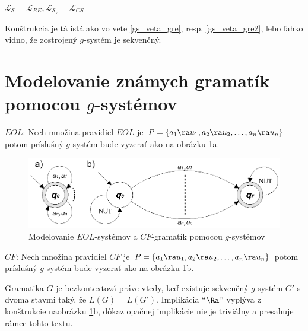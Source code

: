 \pagebreak

\begin{veta}\label{gs_veta_gsek}
$\mathcal{L}_{\mathcal{S}}=\mathcal{L}_{RE},
\mathcal{L}_{\mathcal{S}_\varepsilon}=\mathcal{L}_{CS}$
\end{veta}

\begin{dokaz}
Konštrukcia je tá istá ako vo vete \ref{gs_veta_gre}, resp.
\ref{gs_veta_gre2}, lebo ľahko vidno, že zostrojený $g$-systém je
sekvenčný.
\end{dokaz}

\section{Modelovanie známych gramatík pomocou $g$-systémov}

\begin{priklad}
\begin{description}
\item{$EOL$:} Nech množina pravidiel $EOL$ je $P=\{ a_1\ra u_1,a_2\ra u_2,\dots,a_n\ra u_n\}$
potom príslušný $g$-systém bude vyzerať ako na obrázku
\ref{gs_obr_EOL_g}a.

\begin{figure}[!ht]
\centering
\includegraphics{./OBRAZKY/GSYSTEMS/EOL_G}
\caption{Modelovanie $EOL$-systémov a $CF$-gramatík pomocou $g$-systémov}
\label{gs_obr_EOL_g}
\end{figure}

\item{$CF$:} Nech množina pravidiel $CF$ je $P=\{a_1\ra u_1, a_2\ra u_2,\dots,a_n\ra
u_n\}$ potom príslušný $g$-systém bude vyzerať ako na obrázku
\ref{gs_obr_EOL_g}b.
\end{description}
\end{priklad}

\begin{poznamka}
Gramatika $G$ je bezkontextová práve vtedy, keď existuje sekvenčný
$g$-systém $G'$ s dvoma stavmi taký, že $L(G)=L(G')$. Implikácia
``$\Ra$'' vyplýva z konštrukcie na\linebreak obrázku \ref{gs_obr_EOL_g}b,
dôkaz opačnej implikácie nie je triviálny a presahuje rámec tohto
textu.
\end{poznamka}

